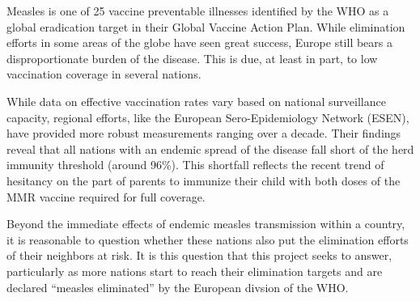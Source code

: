 \documentclass[../Paper.tex]{subfiles}
\begin{document}
\justifying
Measles is one of 25 vaccine preventable illnesses identified by the WHO as a
global eradication target in their Global Vaccine Action Plan. While elimination
efforts in some areas of the globe have seen great success, Europe still bears a
disproportionate burden of the disease. This is due, at least in part, to low
vaccination coverage in several nations\cite{world_health_organization_2017}.

While data on effective vaccination rates vary based on national surveillance
capacity, regional efforts, like the European Sero-Epidemiology Network (ESEN),
have provided more robust measurements ranging over a decade. Their findings
reveal that all nations with an endemic spread of the disease fall short of the
herd immunity threshold (around 96\%)\cite{andrews_tischer_siedler_pebody_2008}.
This shortfall reflects the recent trend of hesitancy on the part of parents to
immunize their child with both doses of the MMR vaccine required for full coverage.

Beyond the immediate effects of endemic measles transmission within a country,
it is reasonable to question whether these nations also put the elimination efforts
of their neighbors at risk. It is this question that this project seeks to answer,
particularly as more nations start to reach their elimination targets and are declared
``measles eliminated'' by the European divsion of the WHO\cite{sniadack_crowcroft_durrheim_rota_2017}.

\clearpage
\end{document}
